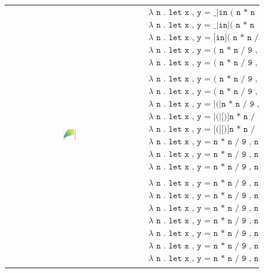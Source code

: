 
\begin{figure}
  \begin{tabular}{cp{}}
  \includegraphics[width=0.1\textwidth]{img/circles-parabola-grow-1.png}
  &
  {
    \begin{align*}
      & \texttt{$\lambda$ n . let x , y = \_|in ( n * n / 9 , n ) , 1} \\
      & \texttt{$\lambda$ n . let x , y = \_|in|( n * n / 9 , n ) , 1} \\
      & \texttt{$\lambda$ n . let x , y = [in]( n * n / 9 , n ) , 1} \\
      & \texttt{$\lambda$ n . let x , y = ( n * n / 9 , n )[in], 1} \\
      & \texttt{$\lambda$ n . let x , y = ( n * n / 9 , n )|in \_ , 1} \\\\
      & \texttt{$\lambda$ n . let x , y = ( n * n / 9 , n|) in x , y , 1 } \\
      & \texttt{$\lambda$ n . let x , y = ( n * n / 9 , n|)|in x , y , 1 } \\
      & \texttt{$\lambda$ n . let x , y = |(|n * n / 9 , n[)]in x , y , 1 } \\
      & \texttt{$\lambda$ n . let x , y = |(|[)]n * n / 9 , n in x , y , 1 } \\
      & \texttt{$\lambda$ n . let x , y = [(][)]n * n / 9 , n in x , y , 1 } \\
      & \texttt{$\lambda$ n . let x , y = n * n / 9 , n in [(][)]x , y , 1 } \\
      & \texttt{$\lambda$ n . let x , y = n * n / 9 , n in ( x , y[)], 1 } \\
      & \texttt{$\lambda$ n . let x , y = n * n / 9 , n in ( x , y|) , 1 } \\\\
      & \texttt{$\lambda$ n . let x , y = n * n / 9 , n in ( x , y ) ,|x + y } \\
      & \texttt{$\lambda$ n . let x , y = n * n / 9 , n in ( x , y ) ,|(|[)]x + y } \\
      & \texttt{$\lambda$ n . let x , y = n * n / 9 , n in ( x , y ) ,|(|x + y[)]} \\
      & \texttt{$\lambda$ n . let x , y = n * n / 9 , n in ( x , y ) , ( x + y|)} \\
      & \texttt{$\lambda$ n . let x , y = n * n / 9 , n in ( x , y ) , ( x + y )|} \\
      & \texttt{$\lambda$ n . let x , y = n * n / 9 , n in ( x , y ) , ( x + y ) /|\_} \\
      & \texttt{$\lambda$ n . let x , y = n * n / 9 , n in ( x , y ) , ( x + y ) / 4|}
    \end{align*}
  }
  \end{tabular}
\end{figure}

